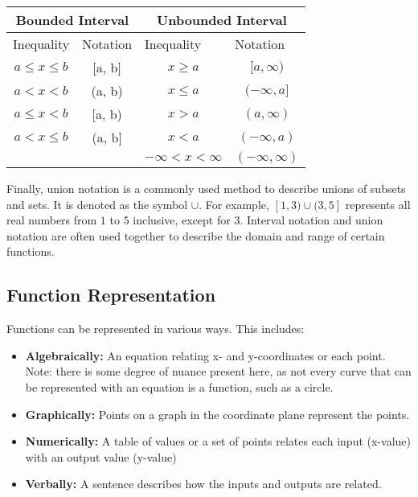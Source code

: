 \documentclass[11pt]{article}
\begin{document}
\begin{table}[H]
\centering
\begin{tabular}{|cc|cc|}
\hline
\multicolumn{2}{|c|}{Bounded Interval} & \multicolumn{2}{c|}{Unbounded Interval} \\ \hline
\multicolumn{1}{|l|}{Inequality} & \multicolumn{1}{l|}{Notation} & \multicolumn{1}{l|}{Inequality} & \multicolumn{1}{l|}{Notation} \\ \hline
\multicolumn{1}{|c|}{$a \leq x \leq b$} & {[}a, b{]} & \multicolumn{1}{c|}{$x \geq a$} & $[a, \infty)$ \\
\multicolumn{1}{|c|}{$a < x < b$} & (a, b)     & \multicolumn{1}{c|}{$x \leq a$} & $(-\infty,a{]}$  \\
\multicolumn{1}{|c|}{$a \leq x < b$} & {[}a, b)   & \multicolumn{1}{c|}{$x > a$} & $(a, \infty)$   \\
\multicolumn{1}{|c|}{$a < x \leq b$}& (a, b{]}& \multicolumn{1}{c|}{$x < a$} & $(-\infty, a)$\\
\multicolumn{1}{|c|}{}           &                               & \multicolumn{1}{c|}{$-\infty < x < \infty$}          & $(-\infty, \infty)$                            \\ \hline
\end{tabular}
\end{table}

Finally, union notation is a commonly used method to describe unions of subsets and sets. It is denoted as the symbol $\cup$. For example, $[1, 3)\cup(3, 5]$ represents all real numbers from $1$ to $5$ inclusive, except for $3$. Interval notation and union notation are often used together to describe the domain and range of certain functions.

\subsection{Function Representation}

Functions can be represented in various ways. This includes:

\begin{itemize}
    \item \textbf{Algebraically:} An equation relating x- and y-coordinates or each point. Note: there is some degree of nuance present here, as not every curve that can be represented with an equation is a function, such as a circle.
    \item \textbf{Graphically:} Points on a graph in the coordinate plane represent the points.
    \item \textbf{Numerically:} A table of values or a set of points relates each input (x-value) with an output value (y-value)
    \item \textbf{Verbally:} A sentence describes how the inputs and outputs are related.
\end{itemize}
\end{document}
